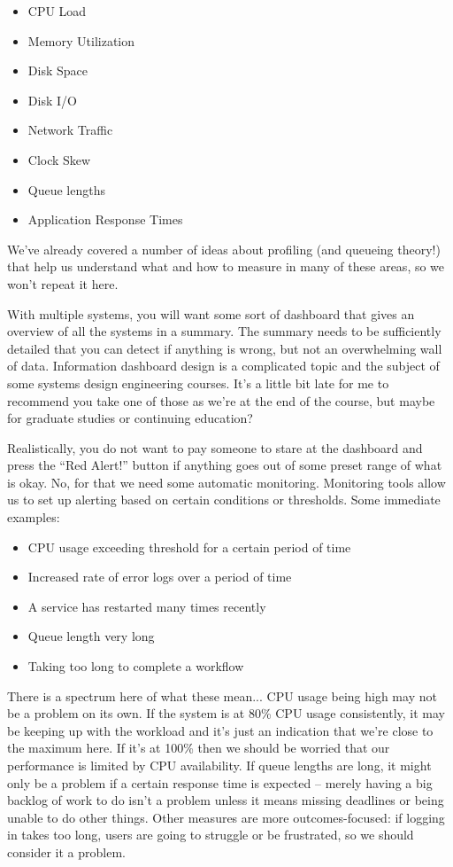 \documentclass[a4paper]{report}
\begin{document}
\begin{multicols}{2}
\begin{itemize}
	\item CPU Load
	\item Memory Utilization
	\item Disk Space
	\item Disk I/O
	\item Network Traffic
	\item Clock Skew
	\item Queue lengths
	\item Application Response Times
\end{itemize}
\end{multicols}

We've already covered a number of ideas about profiling (and queueing theory!) that help us understand what and how to measure in many of these areas, so we won't repeat it here.

With multiple systems, you will want some sort of dashboard that gives an overview of all the systems in a summary. The summary needs to be sufficiently detailed that you can detect if anything is wrong, but not an overwhelming wall of data. Information dashboard design is a complicated topic and the subject of some systems design engineering courses. It's a little bit late for me to recommend you take one of those as we're at the end of the course, but maybe for graduate studies or continuing education?

Realistically, you do not want to pay someone to stare at the dashboard and press the  ``Red Alert!'' button if anything goes out of some preset range of what is okay. No, for that we need some automatic monitoring. Monitoring tools allow us to set up alerting based on certain conditions or thresholds. Some immediate examples:
\begin{itemize}
	\item CPU usage exceeding threshold for a certain period of time
	\item Increased rate of error logs over a period of time
	\item A service has restarted many times recently
	\item Queue length very long
	\item Taking too long to complete a workflow
\end{itemize}



There is a spectrum here of what these mean... CPU usage being high may not be a problem on its own. If the system is at 80\% CPU usage consistently, it may be keeping up with the workload and it's just an indication that we're close to the maximum here. If it's at 100\% then we should be worried that our performance is limited by CPU availability. If queue lengths are long, it might only be a problem if a certain response time is expected -- merely having a big backlog of work to do isn't a problem unless it means missing deadlines or being unable to do other things. Other measures are more outcomes-focused: if logging in takes too long, users are going to struggle or be frustrated, so we should consider it a problem.
\end{document}
